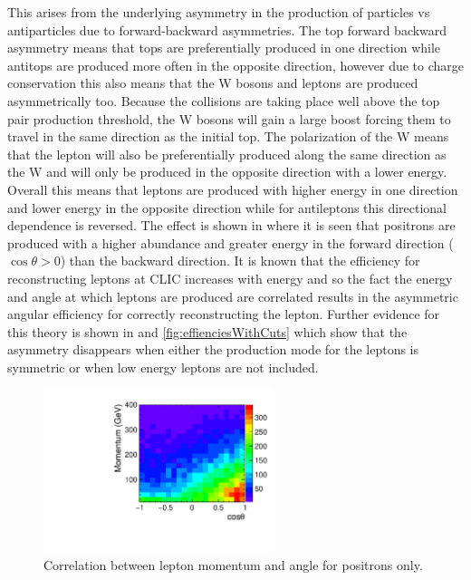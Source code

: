 This arises from the underlying asymmetry in the production of particles vs antiparticles due to forward-backward asymmetries. The top forward backward asymmetry means that tops are preferentially produced in one direction while antitops are produced more often in the opposite direction, however due to charge conservation this also means that the W bosons and leptons are produced asymmetrically too. Because the collisions are taking place well above the top pair production threshold, the W bosons will gain a large boost forcing them to travel in the same direction as the initial top. The polarization of the W means that the lepton will also be preferentially produced along the same direction as the W and will only be produced in the opposite direction with a lower energy. Overall this means that leptons are produced with higher energy in one direction and lower energy in the opposite direction while for antileptons this directional dependence is reversed. The effect is shown in  where it is seen that positrons are produced with a higher abundance and greater energy in the forward direction ($\cos\theta>0$) than the backward direction. It is known that the efficiency for reconstructing leptons at CLIC increases with energy and so the fact the energy and angle at which leptons are produced are correlated results in the asymmetric angular efficiency for correctly reconstructing the lepton. Further evidence for this theory is shown in  and \ref{fig:effienciesWithCuts} which show that the asymmetry disappears when either the production mode for the leptons is symmetric or when low energy leptons are not included.

\begin{figure}
  \centering
  \includegraphics[width=0.6\textwidth]{TopAnalysis/figures/MomentumVsTheta.pdf}
  \caption[Lepton Momentum Vs Angle]{Correlation between lepton momentum and angle for positrons only.}
  \label{fig:efficiency2d}
\end{figure}

